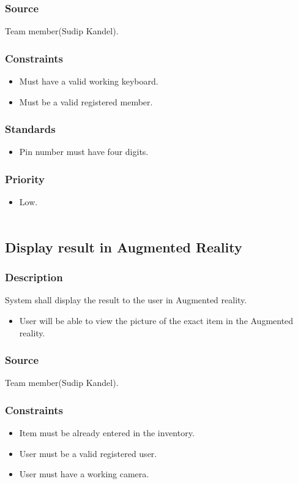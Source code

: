 \subsubsection{Source}
Team member(Sudip Kandel).
\subsubsection{Constraints}
\begin{itemize}
\item Must have a valid working keyboard.
\item Must be a valid registered member.
\end{itemize}
\subsubsection{Standards}
\begin{itemize}
    \item Pin number must have four digits.
\end{itemize}
\subsubsection{Priority}
\begin{itemize}
\item Low.\\ \\
\end{itemize}

\subsection{Display result in Augmented Reality}
\subsubsection{Description}
System shall display the result to the user in Augmented reality.
\begin{itemize}
\item User will be able to view the picture of the exact item in the Augmented reality.
\end{itemize}
\subsubsection{Source}
Team member(Sudip Kandel).
\subsubsection{Constraints}
\begin{itemize}
\item Item must be already entered in the inventory.
\item User must be a valid registered user.
\item User must have a working camera.
\end{itemize}
